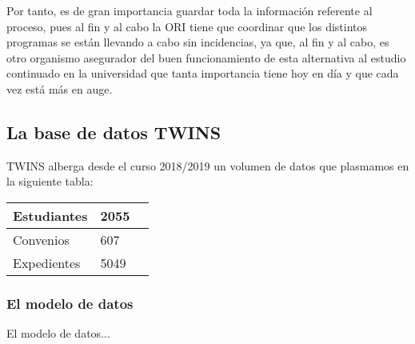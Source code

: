 Por tanto, es de gran importancia guardar toda la información referente al proceso, pues al fin y al cabo la ORI tiene que coordinar que los distintos programas se están llevando a cabo sin incidencias, ya que, al fin y al cabo, es otro organismo asegurador del buen funcionamiento de esta alternativa al estudio continuado en la universidad que tanta importancia tiene hoy en día y que cada vez está más en auge.

\subsection{La base de datos TWINS}


TWINS alberga desde el curso 2018/2019 un volumen de datos que plasmamos en la siguiente tabla:

\begin{center}
	\begin{tabular}{ | m{6em} | m{1cm}| m{1cm} | } 
		\hline
		Estudiantes \footnotemark & 2055 \\ 
		\hline
		Convenios  & 607 \\ 
		\hline
		Expedientes & 5049 \\ 
		\hline
	\end{tabular}
\end{center}


\subsubsection{El modelo de datos}

El modelo de datos...
